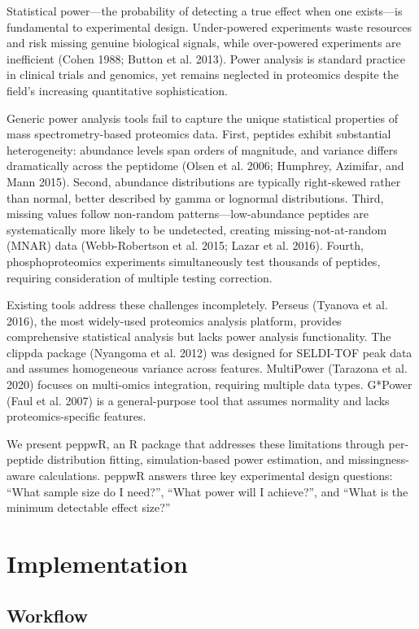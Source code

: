 \documentclass[
]{article}
\begin{document}
Statistical power---the probability of detecting a true effect when one
exists---is fundamental to experimental design. Under-powered
experiments waste resources and risk missing genuine biological signals,
while over-powered experiments are inefficient (Cohen 1988; Button et
al. 2013). Power analysis is standard practice in clinical trials and
genomics, yet remains neglected in proteomics despite the field's
increasing quantitative sophistication.

Generic power analysis tools fail to capture the unique statistical
properties of mass spectrometry-based proteomics data. First, peptides
exhibit substantial heterogeneity: abundance levels span orders of
magnitude, and variance differs dramatically across the peptidome (Olsen
et al. 2006; Humphrey, Azimifar, and Mann 2015). Second, abundance
distributions are typically right-skewed rather than normal, better
described by gamma or lognormal distributions. Third, missing values
follow non-random patterns---low-abundance peptides are systematically
more likely to be undetected, creating missing-not-at-random (MNAR) data
(Webb-Robertson et al. 2015; Lazar et al. 2016). Fourth,
phosphoproteomics experiments simultaneously test thousands of peptides,
requiring consideration of multiple testing correction.

Existing tools address these challenges incompletely. Perseus (Tyanova
et al. 2016), the most widely-used proteomics analysis platform,
provides comprehensive statistical analysis but lacks power analysis
functionality. The clippda package (Nyangoma et al. 2012) was designed
for SELDI-TOF peak data and assumes homogeneous variance across
features. MultiPower (Tarazona et al. 2020) focuses on multi-omics
integration, requiring multiple data types. G*Power (Faul et al. 2007)
is a general-purpose tool that assumes normality and lacks
proteomics-specific features.

We present peppwR, an R package that addresses these limitations through
per-peptide distribution fitting, simulation-based power estimation, and
missingness-aware calculations. peppwR answers three key experimental
design questions: ``What sample size do I need?'', ``What power will I
achieve?'', and ``What is the minimum detectable effect size?''

\section{Implementation}\label{implementation}

\subsection{Workflow}\label{workflow}
\end{document}
